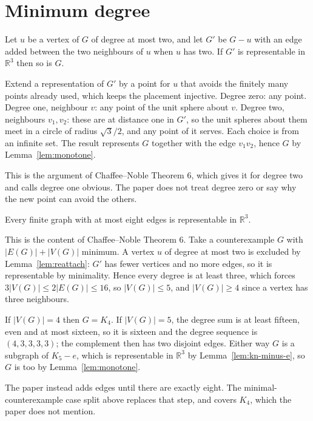 \section{Minimum degree}

\begin{lemma}
  \label{lem:reattach}
  \leanok
  Let $u$ be a vertex of $G$ of degree at most two, and let $G'$ be $G - u$ with an edge added
  between the two neighbours of $u$ when $u$ has two. If $G'$ is representable in $\mathbb{R}^3$
  then so is $G$.

  Extend a representation of $G'$ by a point for $u$ that avoids the finitely many points already
  used, which keeps the placement injective. Degree zero: any point. Degree one, neighbour $v$:
  any point of the unit sphere about $v$. Degree two, neighbours $v_1, v_2$: these are at distance
  one in $G'$, so the unit spheres about them meet in a circle of radius $\sqrt3/2$, and any point
  of it serves. Each choice is from an infinite set. The result represents $G$ together with the
  edge $v_1v_2$, hence $G$ by Lemma~\ref{lem:monotone}.

  This is the argument of Chaffee--Noble Theorem 6, which gives it for degree two and calls degree
  one obvious. The paper does not treat degree zero or say why the new point can avoid the others.
\end{lemma}

\begin{lemma}
  \label{lem:eight-edges}
  \leanok
  Every finite graph with at most eight edges is representable in $\mathbb{R}^3$.

  This is the content of Chaffee--Noble Theorem 6. Take a counterexample $G$ with
  $|E(G)| + |V(G)|$ minimum. A vertex $u$ of degree at most two is excluded by
  Lemma~\ref{lem:reattach}: $G'$ has fewer vertices and no more edges, so it is representable by
  minimality. Hence every degree is at least three, which forces
  $3\lvert V(G)\rvert \le 2\lvert E(G)\rvert \le 16$, so $|V(G)| \le 5$, and $|V(G)| \ge 4$ since
  a vertex has three neighbours.

  If $|V(G)| = 4$ then $G = K_4$. If $|V(G)| = 5$, the degree sum is at least fifteen, even and at
  most sixteen, so it is sixteen and the degree sequence is $(4,3,3,3,3)$; the complement then has
  two disjoint edges. Either way $G$ is a subgraph of $K_5 - e$, which is representable in
  $\mathbb{R}^3$ by Lemma~\ref{lem:kn-minus-e}, so $G$ is too by Lemma~\ref{lem:monotone}.

  The paper instead adds edges until there are exactly eight. The minimal-counterexample case split
  above replaces that step, and covers $K_4$, which the paper does not mention.
\end{lemma}

